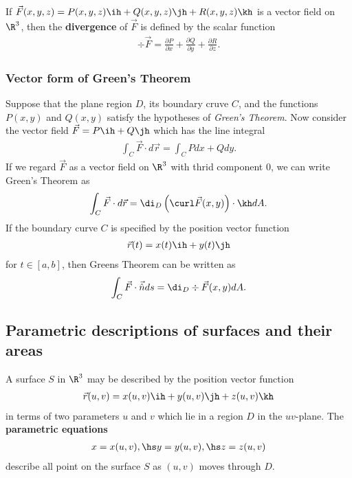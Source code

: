 \documentclass{article}
\begin{document}
\begin{definition}
	If $\vec F(x,y,z)=P(x,y,z)\ih + Q(x,y,z)\jh + R(x,y,z)\kh$ is a vector field on $\R^3$, then
	the \textbf{divergence} of $\vec F$ is defined by the scalar function
	\begin{align*}
		\div \vec F = \frac{\partial P}{\partial x}+\frac{\partial Q}{\partial y} + \frac{\partial R}{\partial z}.
	\end{align*}
\end{definition}

\subsubsection{Vector form of Green's Theorem}

\begin{theorem}
	Suppose that the plane region $D$, its boundary cruve $C$, and the functions
	$P(x,y)$ and $Q(x,y)$ satisfy the hypotheses of \emph{Green's Theorem}. Now
	consider the vector field $\vec F = P\ih + Q\jh$ which has the line integral
	\begin{align*}
		\int_C\vec F \cdot d\vec r = \int_C Pdx + Qdy.
	\end{align*}
	If we regard $\vec F$ as a vector field on $\R^3$ with thrid component $0$,
	we can write Green's Theorem as
	\begin{align*}
		\int_C\vec F \cdot d\vec r = \di_D\left(\curl\vec F(x,y)\right)\cdot\kh dA.
	\end{align*}
	If the boundary curve $C$ is specified by the position vector function
	\begin{align*}
		\vec r(t) = x(t)\ih + y(t)\jh
	\end{align*}
	for $t\in[a,b]$, then Greens Theorem can be written as
	\begin{align*}
		\int_C \vec F\cdot \vec{\hat n} ds = \di_D \div\vec F(x,y)dA.
	\end{align*}
\end{theorem}


\subsection{Parametric descriptions of surfaces and their areas}


\begin{definition}
	A surface $S$ in $\R^3$ may be described by the position vector function
	\begin{align*}
		\vec r(u,v) = x(u,v)\ih + y(u,v)\jh + z(u,v)\kh
	\end{align*}
	in terms of two parameters $u$ and $v$ which lie in a region $D$ in the $uv$-plane.
	The \textbf{parametric equations}
	\begin{align*}
		x = x(u,v),\hs y=y(u,v),\hs z=z(u,v)
	\end{align*}
	describe all point on the surface $S$ as $(u,v)$ moves through $D$.
\end{definition}
\end{document}
